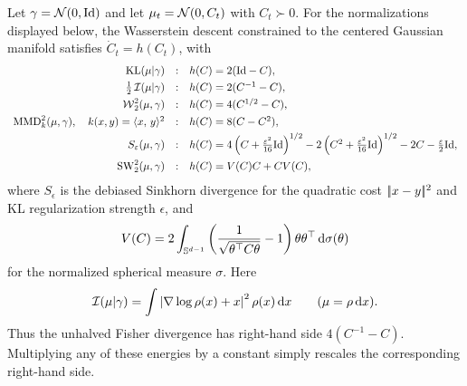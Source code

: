 \begin{prop}\label{prop-centered-gaussian-covariance-catalogue}
	Let $\gamma=\mathcal{N}(0,\mathrm{Id})$ and let $\mu_t=\mathcal{N}(0,C_t)$ with $C_t\succ0$. For the normalizations displayed below, the Wasserstein descent constrained to the centered Gaussian manifold satisfies $\dot C_t=h(C_t)$, with
	\[
	\begin{array}{rcl}
		\KL(\mu|\gamma) &:& h(C)=2(\Id-C), \\[.35em]
		\frac12\,\mathcal I(\mu|\gamma) &:& h(C)=2(C^{-1}-C), \\[.35em]
		\Wass_2^2(\mu,\gamma) &:& h(C)=4(C^{1/2}-C), \\[.35em]
		\MMD_k^2(\mu,\gamma),\quad k(x,y)=\dotp{x}{y}^2
\index{maximum mean discrepancy}%
			&:& h(C)=8(C-C^2), \\[.35em]
		S_\epsilon(\mu,\gamma)
			&:& h(C)=
			4\left(C+\frac{\epsilon^2}{16}\Id\right)^{1/2}
			-2\left(C^2+\frac{\epsilon^2}{16}\Id\right)^{1/2}
			-2C-\frac{\epsilon}{2}\Id, \\[.75em]
		\SW_2^2(\mu,\gamma)
			&:& h(C)=V(C)C+CV(C),
	\end{array}
	\]
	where $S_\epsilon$ is the debiased Sinkhorn divergence for the quadratic cost $|\!| x-y |\!|^2$ and KL regularization strength $\epsilon$, and
	\[
		V(C)=
		2\int_{\mathbb{S}^{d-1}}
		\left(\frac{1}{\sqrt{\theta^\top C\theta}}-1\right)
		\theta\theta^\top \,\mathrm{d}\sigma(\theta)
	\]
	for the normalized spherical measure $\sigma$. Here
	\[
		\mathcal I(\mu|\gamma)=\int \left|\nabla\log\rho(x)+x\right|^2\rho(x)\,\mathrm{d} x
		\qquad(\mu=\rho\,\mathrm{d} x).
	\]
	Thus the unhalved Fisher divergence has right-hand side $4(C^{-1}-C)$. Multiplying any of these energies by a constant simply rescales the corresponding right-hand side.
\end{prop}

